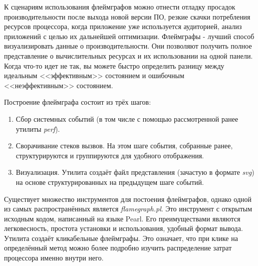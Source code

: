 К сценариям использования флеймграфов можно отнести отладку просадок производительности после выхода новой версии ПО,
резкие скачки потребления ресурсов процессора, когда приложение уже используется аудиторией, анализ приложений с целью
их дальнейшей оптимизации.
Флеймграфы - лучший способ визуализировать данные о производительности.
Они позволяют получить полное представление о вычислительных ресурсах и их использовании на одной панели. 
Когда что-то идет не так, вы можете быстро определить разницу между идеальным <<эффективным>> состоянием и ошибочным <<неэффективным>> состоянием.

\pagebreak
Построение флеймграфа состоит из трёх шагов:
\begin{enumerate}
    \item Сбор системных событий (в том числе с помощью рассмотренной ранее утилиты \textit{perf}).
    \item Сворачивание стеков вызвов. На этом шаге события, собранные ранее, структурируются и группируются для удобного отображения.
    \item Визуализация. Утилита создаёт файл представления (зачастую в формате \textit{svg}) на основе структурированных на предыдущем шаге событий.
\end{enumerate}

Существует множество инструментов для постоения флеймграфов, однако одной из самых распространённых является \textit{flamegraph.pl}.
Это инструмент с открытым исходным кодом, написанный на языке Pearl. Его преимуществами являются легковесность, простота установки и использования,
удобный формат вывода. Утилита создаёт кликабельные флеймграфы. Это означает, что при клике на определённый метод можно более подробно изучить распределение
затрат процессора именно внутри него.
